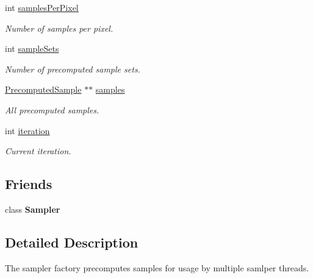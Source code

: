 \begin{DoxyCompactItemize}
int \hyperlink{classembree_1_1_sampler_factory_ae275dc3161d4a7c2a5643abf5bdcd1ef}{samplesPerPixel}
\begin{DoxyCompactList}\small\item\em Number of samples per pixel. \item\end{DoxyCompactList}\item 
int \hyperlink{classembree_1_1_sampler_factory_adb750ed990fe1b5668c93d1d7ce65e73}{sampleSets}
\begin{DoxyCompactList}\small\item\em Number of precomputed sample sets. \item\end{DoxyCompactList}\item 
\hyperlink{structembree_1_1_precomputed_sample}{PrecomputedSample} $\ast$$\ast$ \hyperlink{classembree_1_1_sampler_factory_ab19a6e8dfcb6a246a329997f71b0e372}{samples}
\begin{DoxyCompactList}\small\item\em All precomputed samples. \item\end{DoxyCompactList}\item 
int \hyperlink{classembree_1_1_sampler_factory_a27184a51d0d3e9a6268ed5d8cc887cb3}{iteration}
\begin{DoxyCompactList}\small\item\em Current iteration. \item\end{DoxyCompactList}\end{DoxyCompactItemize}
\subsection*{Friends}
\begin{DoxyCompactItemize}
\item 
\hypertarget{classembree_1_1_sampler_factory_a8f5378aba3dfbbf24026a47e1b005214}{
class {\bfseries Sampler}}
\label{classembree_1_1_sampler_factory_a8f5378aba3dfbbf24026a47e1b005214}

\end{DoxyCompactItemize}


\subsection{Detailed Description}
The sampler factory precomputes samples for usage by multiple samlper threads. 

